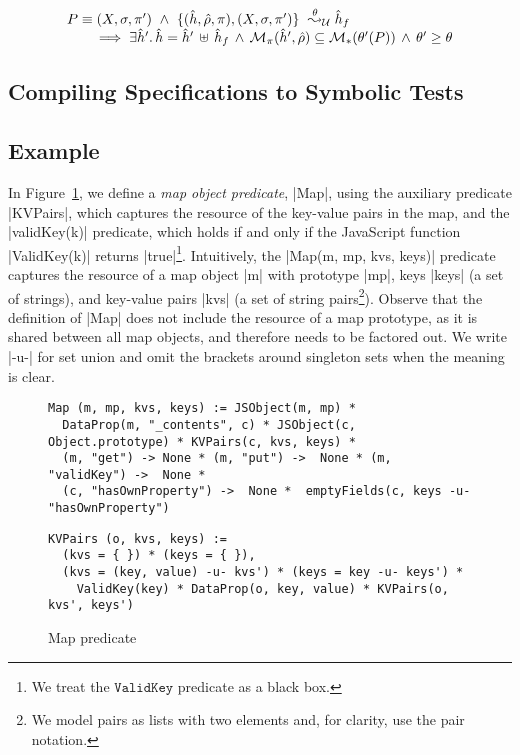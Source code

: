 \begin{theorem}
$$
\begin{array}{l}
P \equiv (\existentials, \sfs, \pfs') \ \wedge \ \unificationfull{\sheap, \sstore, \pc}{\existentials, \sfs, \pfs'}{\sheap_f}{\subst} \\ 
   \qquad \implies 
		\exists \sheap' . \, \sheap = \sheap' \dunion \sheap_f  \, \wedge \, 
		\smodels{\sheap', \sstore}{\pc} \subseteq \sepmodels{\subst'(P)}  \, \wedge \, 
		\subst' \geq \subst 
\end{array}
$$ 

\end{theorem}

\subsection{Compiling \jsil Specifications to Symbolic Tests}



\subsection{Example} 

In Figure~\ref{fig:map:example}, we define a \emph{map object predicate}, \jsinline|Map|, 
using the auxiliary predicate \jsinline|KVPairs|, which captures the resource of the key-value pairs in the map, 
and the \jsinline|validKey(k)| predicate, which holds if and only if the 
JavaScript function \jsinline|ValidKey(k)| returns \jsinline|true|\footnote{We treat the $\mathtt{ValidKey}$ predicate as a black box.}.
%
Intuitively, the \jsinline|Map(m, mp, kvs, keys)| predicate captures the resource 
of a map object \jsinline|m| with prototype \jsinline|mp|, keys \jsinline|keys| (a set of strings),
and key-value pairs \jsinline|kvs| (a set of string pairs\footnote{We model pairs as lists with two elements and, for clarity, use the pair notation.}). 
Observe that the definition of \jsinline|Map| does not include the resource of a map prototype, as
it is shared between all map objects, and therefore needs to be factored out.  
%
We write \jsinline|-u-| for set union and omit the brackets around singleton 
sets when the meaning is clear. %

\begin{figure}[t!]
{\scriptsize
 \begin{verbatim}
Map (m, mp, kvs, keys) := JSObject(m, mp) * 
  DataProp(m, "_contents", c) * JSObject(c, Object.prototype) * KVPairs(c, kvs, keys) *
  (m, "get") -> None * (m, "put") ->  None * (m, "validKey") ->  None * 
  (c, "hasOwnProperty") ->  None *  emptyFields(c, keys -u- "hasOwnProperty")
  \end{verbatim}
  \vspace*{-0.3cm}
 \begin{verbatim}
KVPairs (o, kvs, keys) := 
  (kvs = { }) * (keys = { }),
  (kvs = (key, value) -u- kvs') * (keys = key -u- keys') * 
    ValidKey(key) * DataProp(o, key, value) * KVPairs(o, kvs', keys')
\end{verbatim}}
\caption{Map predicate \label{fig:map:example}}
\end{figure}

